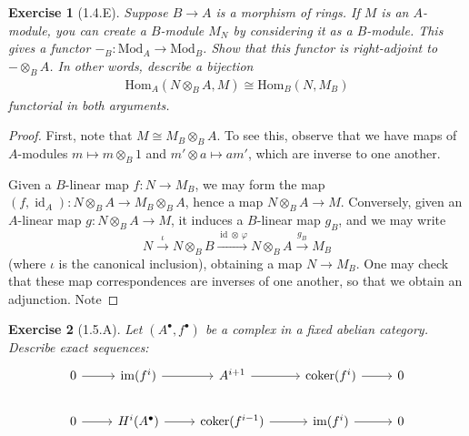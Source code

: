 \documentclass{amsart}
\newtheorem*{exercise*}{Exercise}
\begin{document}
\vspace{0.1in}


\begin{exercise*}[1.4.E]
    Suppose $B\rightarrow A$ is a morphism of rings. If $M$ is an $A$-module, you can create a $B$-module $M_N$ by considering it as a $B$-module. This gives a functor $-_B:\mathrm{Mod}_A\rightarrow \mathrm{Mod}_B$. Show that this functor is right-adjoint to $-\otimes_B A$. In other words, describe a bijection
    \begin{align*}
        \mathrm{Hom}_A(N\otimes_B A, M)\cong \mathrm{Hom}_B(N, M_B)
    \end{align*}
    functorial in both arguments. 
\end{exercise*}

\begin{proof}
    First, note that $M \cong M_B \otimes_B A$. To see this, observe that we have maps of $A$-modules 
    $m \mapsto m \otimes_B 1$ and $m' \otimes a \mapsto am'$, which are inverse to one another.
    
    Given a $B$-linear map $f:N \to M_B$, we may form the map $(f, \operatorname{id}_A): N \otimes_B A \to M_B \otimes_B A$, hence a map $N \otimes_B A \to M$. Conversely, given an $A$-linear map 
    $g: N \otimes_B A \to M$, it induces a $B$-linear map $g_B$, and we may write
    \[ N \xrightarrow{\iota} N \otimes_B B \xrightarrow{\operatorname{id} \otimes \,\varphi} N \otimes_B A \xrightarrow{g_B} M_B\]
    (where $\iota$ is the canonical inclusion), obtaining a map $N \to M_B$. One may check that these map correspondences are inverses of one another,
    so that we obtain an adjunction. Note 
\end{proof}

\vspace{0.1in}


\begin{exercise*}[1.5.A]
    Let $(A^\bullet, f^\bullet)$ be a complex in a fixed abelian category. Describe exact sequences:
    \begin{equation*}
        \begin{tikzcd}
            0 \arrow[r] & \mathrm{im}(f^i) \arrow[r] & A^{i+1} \arrow[r] & \mathrm{coker}(f^i) \arrow[r] & 0 \\
            0 \arrow[r] & H^i(A^\bullet) \arrow[r] & \mathrm{coker}(f^{i-1}) \arrow[r] & \mathrm{im}(f^i) \arrow[r] & 0
        \end{tikzcd}
    \end{equation*}
\end{exercise*}
\end{document}
